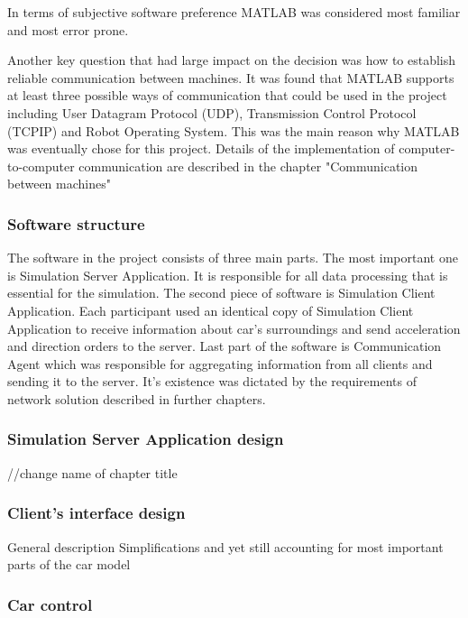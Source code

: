 \documentclass[11pt]{article}
\begin{document}
In terms of subjective software preference MATLAB was considered most familiar and most error prone.  

Another key question that had large impact on the decision was how to establish reliable communication between machines. 
It was found that MATLAB supports at least three possible ways of communication that could be used in the project including User Datagram Protocol (UDP), Transmission Control Protocol (TCPIP) and Robot Operating System. This was the main reason why MATLAB was eventually chose for this project.
Details of the implementation of computer-to-computer communication are described in the chapter "Communication between machines"

\subsubsection{Software structure}


The software in the project consists of three  main parts. The most important one is Simulation Server Application. It is responsible for all data processing that is essential for the simulation. The second piece of software is Simulation Client Application. Each participant used an identical copy of Simulation Client Application to receive information about car's surroundings and send acceleration and direction orders to the server. Last part of the software is Communication Agent which was responsible for aggregating information from all clients and sending it to the server. It's existence was dictated by the requirements of network solution described in further chapters.



\subsubsection{Simulation Server Application design}
//change name of chapter title








\subsubsection{Client's interface design}

General description Simplifications and yet still accounting for most important parts of
the car model

\subsubsection{Car control}
\end{document}
